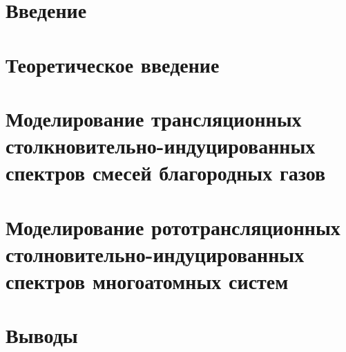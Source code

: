 \documentclass[12pt, a4paper, oneside]{extbook}
\begin{document}


\tableofcontents

\chapter{Введение}


\chapter{Теоретическое введение}


\chapter{Моделирование трансляционных столкновительно-индуцированных спектров смесей благородных газов} \label{chapter:two-atom}


\chapter{Моделирование рототрансляционных столновительно-индуцированных спектров многоатомных систем}


\chapter{Выводы}




%

\end{document}
